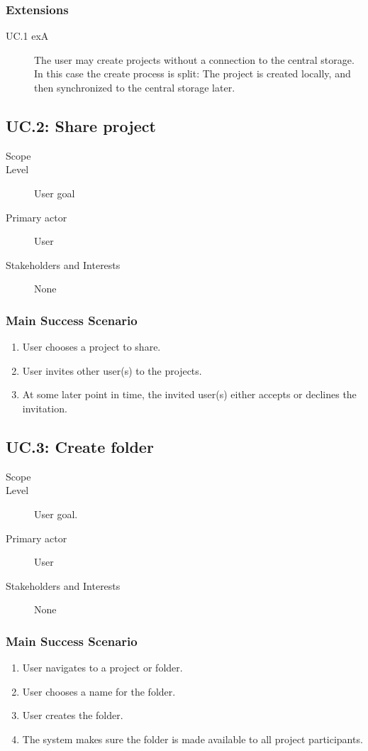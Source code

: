 \subsubsection{Extensions}
\begin{description}
    \item[UC.1 exA] The user may create projects without a connection to the central storage. In this case the create process is split: The project is created locally, and then synchronized to the central storage later.
\end{description}

\subsection{UC.2: Share project}
\begin{description}
    \item[Scope] \SOP{}
    \item[Level] User goal
    \item[Primary actor] User
    \item[Stakeholders and Interests] None
\end{description}
    
\subsubsection{Main Success Scenario}
\begin{enumerate}
    \item User chooses a project to share.
    \item User invites other user(s) to the projects.
    \item At some later point in time, the invited user(s) either accepts or declines the invitation.
\end{enumerate}

\subsection{UC.3: Create folder}
\begin{description}
    \item[Scope] \SOP{}
    \item[Level] User goal.
    \item[Primary actor] User
    \item[Stakeholders and Interests] None
\end{description}
    
\subsubsection{Main Success Scenario}
\begin{enumerate}
    \item User navigates to a project or folder.
    \item User chooses a name for the folder.
    \item User creates the folder.
    \item The system makes sure the folder is made available to all project participants.
\end{enumerate}
    
